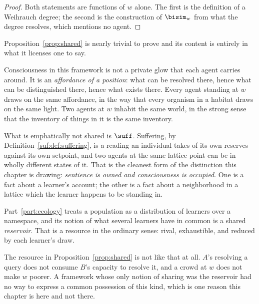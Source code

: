 \begin{proof}
Both statements are functions of $w$ alone.
The first is the definition of a Weihrauch degree; the second is the
construction of $\bisim_w$ from what the degree resolves, which mentions
no agent.
\end{proof}

\begin{remark}
\label{rmk:shared}
Proposition~\ref{prop:shared} is nearly trivial to prove and its content
is entirely in what it licenses one to say.

Consciousness in this framework is not a private glow that each agent
carries around.
It is an \emph{affordance of a position}: what can be resolved there,
hence what can be distinguished there, hence what exists there.
Every agent standing at $w$ draws on the same affordance, in the way that
every organism in a habitat draws on the same light.
Two agents at $w$ inhabit the same world, in the strong sense that the
inventory of things in it is the same inventory.

What is emphatically not shared is $\suff$.
Suffering, by Definition~\ref{suf:def:suffering}, is a reading an
individual takes of its own reserves against its own setpoint, and two
agents at the same lattice point can be in wholly different states of it.
That is the cleanest form of the distinction this chapter is drawing:
\emph{sentience is owned and consciousness is occupied}.
One is a fact about a learner's account; the other is a fact about a
neighborhood in a lattice which the learner happens to be standing in.
\end{remark}

\begin{remark}
\label{rmk:ecology-couldnt}
Part~\ref{part:ecology} treats a population as a distribution of learners
over a namespace, and its notion of what several learners have in common
is a shared \emph{reservoir}.
That is a resource in the ordinary sense: rival, exhaustible, and reduced
by each learner's draw.

The resource in Proposition~\ref{prop:shared} is not like that at all.
$A$'s resolving a query does not consume $B$'s capacity to resolve it,
and a crowd at $w$ does not make $w$ poorer.
A framework whose only notion of sharing was the reservoir had no way to
express a common possession of this kind, which is one reason this
chapter is here and not there.
\end{remark}

